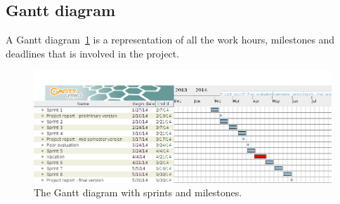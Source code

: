 \subsection{Gantt diagram}

A Gantt diagram~\ref{fig:gantt} is a representation of all the work hours, milestones and deadlines that is involved in the project. 

\begin{figure}[H]
\includegraphics[width=\textwidth]{ch/planning/fig/gantt.png}
\caption{The Gantt diagram with sprints and milestones.}
\label{fig:gantt}
\end{figure}



\newpage

\newpage

\newpage


